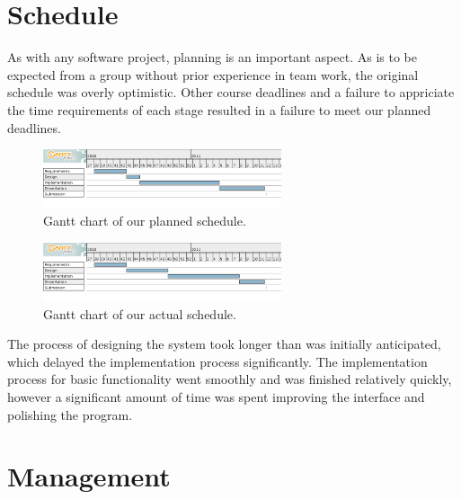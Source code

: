 \label{Organisation}

\section{Schedule}

As with any software project, planning is an important aspect. As is to be expected from a group without prior experience in team work, the original schedule was overly optimistic. Other course deadlines and a failure to appriciate the time requirements of each stage resulted in a failure to meet our planned deadlines. 

\begin{figure}[!h]
    \begin{center}
        \includegraphics[width=7cm]{appendix/diagrams/GIMplan.png}
        \caption{Gantt chart of our planned schedule.}
        \label{lockingDia}
    \end{center}
\end{figure}

\begin{figure}[!h]
    \begin{center}
        \includegraphics[width=7cm]{appendix/diagrams/GIMreal.png}
        \caption{Gantt chart of our actual schedule.}
        \label{lockingDia}
    \end{center}
\end{figure}

The process of designing the system took longer than was initially anticipated, which delayed the implementation process significantly. The implementation process for basic functionality went smoothly and was finished relatively quickly, however a significant amount of time was spent improving the interface and polishing the program.

\section{Management}


